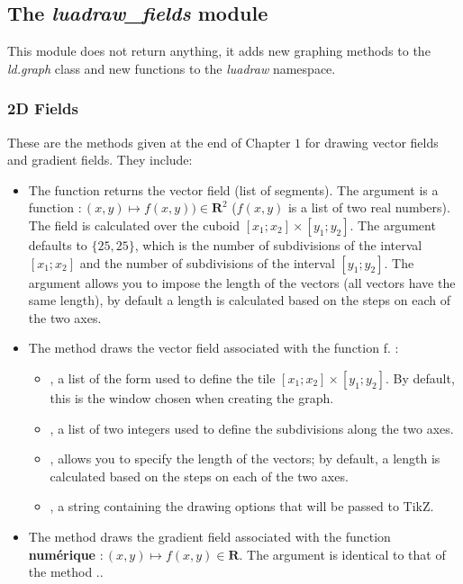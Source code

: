 \subsection{The \emph{luadraw\_fields} module}

This module does not return anything, it adds new graphing methods to the \emph{ld.graph} class and new functions to the \emph{luadraw} namespace.

\subsubsection{2D Fields}

These are the methods given at the end of Chapter $1$ for drawing vector fields and gradient fields. They include:

\begin{itemize}
    \item The function  returns the vector field (list of segments). The argument  is a function $\colon(x,y)\mapsto f(x,y))\in\mathbf R^2$ ($f(x,y)$ is a list of two real numbers). The field is calculated over the cuboid $[x_1;x_2]\times[y_1;y_2]$. The argument  defaults to $\{25,25\}$, which is the number of subdivisions of the interval $[x_1;x_2]$ and the number of subdivisions of the interval $[y_1;y_2]$. The argument  allows you to impose the length of the vectors (all vectors have the same length), by default a length is calculated based on the steps on each of the two axes.
    
    \item The method  draws the vector field associated with the function \argu f. \writeoptions:
    \begin{itemize}
        \item {}, a list of the form  used to define the tile $[x_1;x_2]\times [y_1;y_2]$. By default, this is the window chosen when creating the graph.

        \item {}, a list of two integers used to define the subdivisions along the two axes.

        \item {}, allows you to specify the length of the vectors; by default, a length is calculated based on the steps on each of the two axes.

        \item {}, a string containing the drawing options that will be passed to TikZ.
    \end{itemize}
        
    \item The method  draws the gradient field associated with the function \textbf{numérique} $\colon(x,y)\mapsto f(x,y)\in \mathbf R$. The argument  is identical to that of the method ..
\end{itemize}

